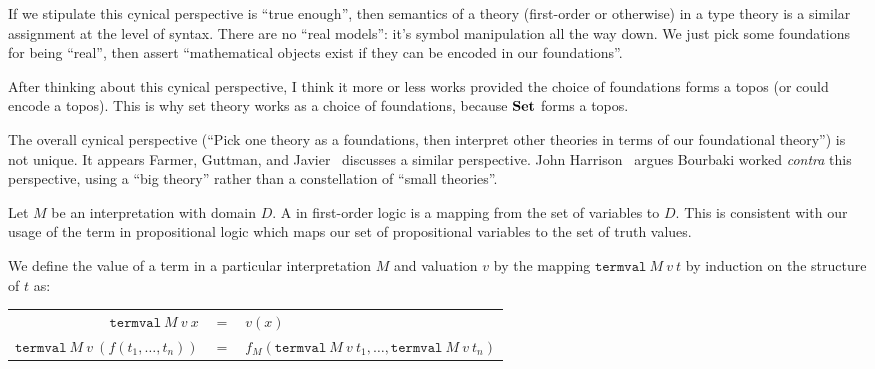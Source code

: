 \begin{node}[Semantics]
\begin{definition}
\begin{node}
\begin{node}
If we stipulate this cynical perspective is ``true enough'', then
semantics of a theory (first-order or otherwise) in a type theory is a
similar assignment at the level of syntax. There are no ``real models'':
it's symbol manipulation all the way down. We just pick some foundations
for being ``real'', then assert ``mathematical objects exist if they can
be encoded in our foundations''.
\end{node}
\begin{node}\label{fol-000I}%
After thinking about this cynical perspective, I think it more or less
works provided the choice of foundations forms a topos (or could encode
a topos). This is why set theory works as a choice of foundations,
because $\mathbf{Set}$ forms a topos.

The overall cynical perspective (``Pick one theory as a foundations,
then interpret other theories in terms of our foundational theory'') is
not unique. It appears Farmer, Guttman, and
Javier~\cite{farmer1992little} discusses a similar perspective. John
Harrison~\cite[\S1.4]{harrison1996formalized} argues Bourbaki worked
\emph{contra} this perspective, using a ``big theory'' rather than a
constellation of ``small theories''.
\end{node}
\end{node}
\end{definition}

\begin{definition}\label{fol-0007}%
Let $M$ be an interpretation with domain $D$. A  in
first-order logic is a mapping from the set of variables to $D$.
This is consistent with our usage of the term in propositional logic
 which maps our set of propositional variables to the
set of truth values.
\end{definition}

\begin{definition}\label{fol-0008}%
We define the value of a term in a particular interpretation $M$ and
valuation $v$ by the mapping $\mathtt{termval}~M~v~t$ by induction on
the structure of $t$ as:
\begin{center}
\begin{tabular}{rcl}
$\mathtt{termval}~M~v~x$ & $=$ & $v(x)$\\
$\mathtt{termval}~M~v~(f(t_{1},\dots,t_{n}))$ & $=$ & $f_{M}(\mathtt{termval}~M~v~t_{1},\dots,\mathtt{termval}~M~v~t_{n})$\\
\end{tabular}
\end{center}
\end{definition}


\end{node}
